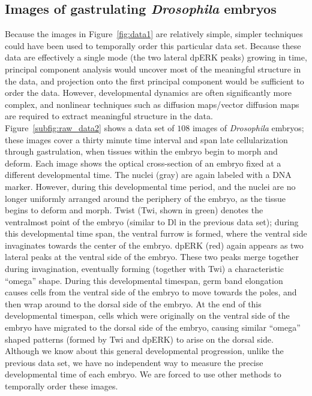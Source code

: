 \documentclass{pnastwo}
\begin{document}
\begin{article}
\subsection{Images of gastrulating {\it Drosophila} embryos}

Because the images in Figure~\ref{fig:data1} are relatively simple, simpler techniques could have been used to temporally order this particular data set. 
%
Because these data are effectively a single mode (the two lateral dpERK peaks) growing in time,
principal component analysis \cite{shlens2005tutorial} would uncover most of the meaningful structure in the data, and projection onto the first principal component would be sufficient to order the data.
%
However, developmental dynamics are often significantly more complex, and nonlinear techniques such as diffusion maps/vector diffusion maps are required to extract meaningful structure in the data. 
%
Figure~\ref{subfig:raw_data2} shows a data set of $108$ images of {\it Drosophila} embryos;
these images cover a thirty minute time interval and span late cellularization through gastrulation, when tissues within the embryo begin to morph and deform. 
%
Each image shows the optical cross-section of an embryo fixed at a different developmental time.
%
The nuclei (gray) are again labeled with a DNA marker.
%
However, during this developmental time period, and the nuclei are no longer uniformly arranged around the periphery of the embryo, as the tissue begins to deform and morph.
%
Twist (Twi, shown in green) denotes the ventralmost point of the embryo (similar to Dl in the previous data set); during this developmental time span, the ventral furrow is formed, where the ventral side invaginates towards the center of the embryo.
%
dpERK (red) again appears as two lateral peaks at the ventral side of the embryo.
%
These two peaks merge together during invagination, eventually forming (together with Twi) a characteristic ``omega'' shape.
%
During this developmental timespan, germ band elongation causes cells from the ventral side of the embryo to move towards the poles, and then wrap around to the dorsal side of the embryo.
%
At the end of this developmental timespan, cells which were originally on the ventral side of the embryo have migrated to the dorsal side of the embryo, causing similar ``omega'' shaped patterns (formed by Twi and dpERK) to arise on the dorsal side.
%
Although we know about this general developmental progression, unlike the previous data set, we have no independent way to measure the precise developmental time of each embryo.
%
We are forced to use other methods to temporally order these images.


\end{article}
\end{document}
